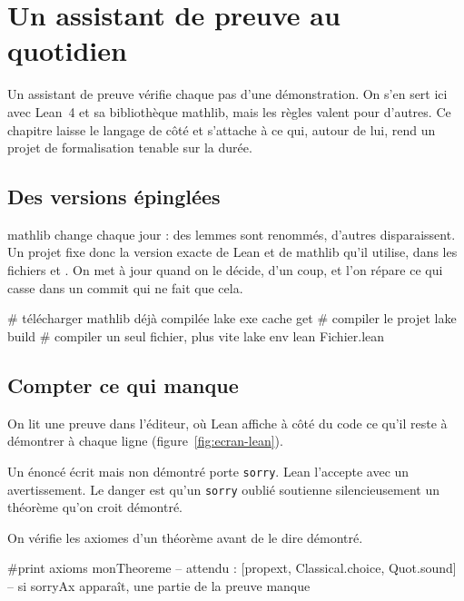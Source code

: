 \chapter{Un assistant de preuve au quotidien}\label{ch:lean}

Un assistant de preuve vérifie chaque pas d'une démonstration. On s'en sert ici avec
Lean~4 et sa bibliothèque mathlib, mais les règles valent pour d'autres. Ce chapitre laisse
le langage de côté et s'attache à ce qui, autour de lui, rend un projet de
formalisation tenable sur la durée.

\section{Des versions épinglées}

mathlib change chaque jour : des lemmes sont renommés, d'autres disparaissent. Un projet
fixe donc la version exacte de Lean et de mathlib qu'il utilise, dans les fichiers
 et . On met à jour quand on le
décide, d'un coup, et l'on répare ce qui casse dans un commit qui ne fait que cela.

\begin{terminal}
# télécharger mathlib déjà compilée
lake exe cache get
# compiler le projet
lake build
# compiler un seul fichier, plus vite
lake env lean Fichier.lean
\end{terminal}

\section{Compter ce qui manque}

On lit une preuve dans l'éditeur, où Lean affiche à côté du code ce qu'il reste à
démontrer à chaque ligne (figure~\ref{fig:ecran-lean}).



Un énoncé écrit mais non démontré porte \texttt{sorry}. Lean l'accepte avec un
avertissement. Le danger est qu'un \texttt{sorry} oublié soutienne silencieusement un
théorème qu'on croit démontré.

\begin{regle}
On vérifie les axiomes d'un théorème avant de le dire démontré.
\end{regle}

\begin{terminal}
#print axioms monTheoreme
-- attendu : [propext, Classical.choice, Quot.sound]
-- si sorryAx apparaît, une partie de la preuve manque
\end{terminal}

